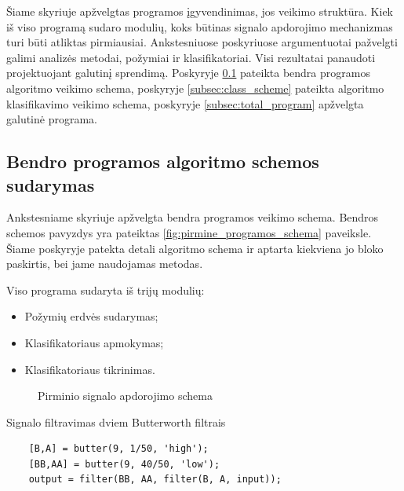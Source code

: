 \documentclass[]{vgtuef}
\begin{document}
Šiame skyriuje apžvelgtas programos įgyvendinimas, jos veikimo struktūra. Kiek iš viso programą sudaro modulių, koks būtinas signalo apdorojimo mechanizmas turi būti atliktas pirmiausiai. Ankstesniuose poskyriuose argumentuotai pažvelgti galimi analizės metodai, požymiai ir klasifikatoriai. Visi rezultatai panaudoti projektuojant galutinį sprendimą. Poskyryje \ref{subsec:total_scheme} pateikta bendra programos algoritmo veikimo schema, poskyryje \ref{subsec:class_scheme} pateikta algoritmo klasifikavimo veikimo schema, poskyryje \ref{subsec:total_program} apžvelgta galutinė programa.

\subsection{Bendro programos algoritmo schemos sudarymas}
\label{subsec:total_scheme}

Ankstesniame skyriuje apžvelgta bendra programos veikimo schema. Bendros schemos pavyzdys yra pateiktas \ref{fig:pirmine_programos_schema} paveiksle. Šiame poskyryje patekta detali algoritmo schema ir aptarta kiekviena jo bloko paskirtis, bei jame naudojamas metodas.

Viso programa sudaryta iš trijų modulių:

\begin{itemize}
\item Požymių erdvės sudarymas;
\item Klasifikatoriaus apmokymas;
\item Klasifikatoriaus tikrinimas.
\end{itemize}

\begin{figure}
  \centering
  
  \caption{Pirminio signalo apdorojimo schema}
  \label{fig:pre_phase}
\end{figure}

\begin{cfigure}[b]
  \centering
  \caption{Signalo filtravimas dviem Butterworth filtrais}
  \label{code:filter}
  \begin{lstlisting}
    [B,A] = butter(9, 1/50, 'high');
    [BB,AA] = butter(9, 40/50, 'low');
    output = filter(BB, AA, filter(B, A, input));
  \end{lstlisting}
\end{cfigure}
\end{document}
